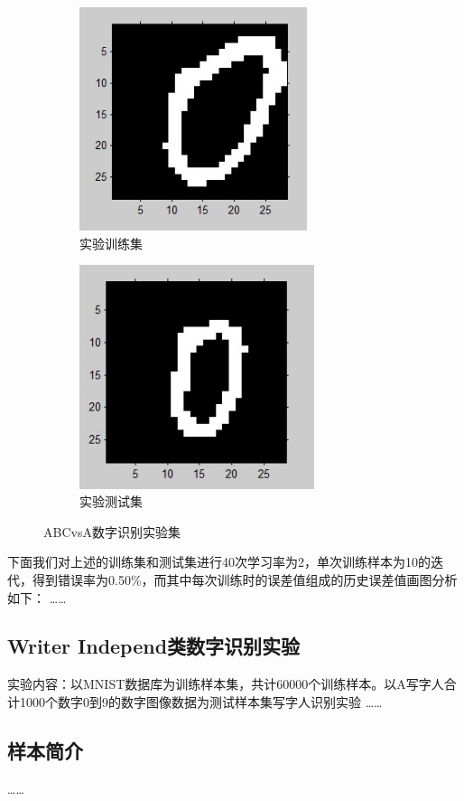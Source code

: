 \begin{figure}[htbp] %
    \begin{subfigure}{0.5\textwidth}
        \centering
        \includegraphics[height=6.54cm]{image/chap04/1.jpg}
        \caption{实验训练集}
        \label{fig:compare1}
    \end{subfigure}
    \begin{subfigure}{0.5\textwidth}
        \centering
        \includegraphics[height=6.54cm]{image/chap04/2.jpg}
        \caption{实验测试集}
        \label{fig:compare2}
    \end{subfigure}
    \caption{ABCvsA数字识别实验集}
    \label{fig:complex}
\end{figure}

下面我们对上述的训练集和测试集进行40次学习率为2，单次训练样本为10的迭代，得到错误率为0.50\%，而其中每次训练时的误差值组成的历史误差值画图分析如下：
……
\subsection{Writer Independ类数字识别实验}
实验内容：以MNIST数据库为训练样本集，共计60000个训练样本。以A写字人合计1000个数字0到9的数字图像数据为测试样本集写字人识别实验
……
\subsection{样本简介}
……

